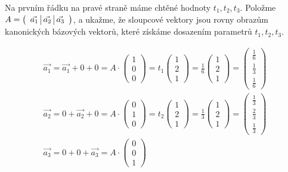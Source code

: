 \documentclass[12pt]{article}
\begin{document}
\begin{enumerate}
    Na prvním řádku na pravé straně máme chtěné hodnoty $t_1, t_2, t_3$.
    Položme $A = \left(\begin{array}{c} \vec{a_1} \;\vline\; \vec{a_2} \;\vline\; \vec{a_3} \end{array}\right)$,
    a ukažme, že sloupcové vektory jsou rovny obrazům kanonických bázových vektorů, které získáme dosazením parametrů $t_1, t_2, t_3$.

    \renewcommand{\arraystretch}{1.3}
    \begin{align*}
      \vec{a_1} = \vec{a_1} + 0 + 0 = A \cdot \left(\begin{array}{c} 1 \\ 0 \\ 0 \end{array}\right)
        = t_1 \left(\begin{array}{c} 1 \\ 2 \\ 1 \end{array}\right)
        = \frac{1}{6} \left(\begin{array}{c} 1 \\ 2 \\ 1 \end{array}\right)
        = \left(\begin{array}{c} \frac{1}{6} \\ \frac{1}{3} \\ \frac{1}{6} \end{array}\right) \\
      \vec{a_2} = 0 + \vec{a_2} + 0 = A \cdot \left(\begin{array}{c} 0 \\ 1 \\ 0 \end{array}\right)
        = t_2 \left(\begin{array}{c} 1 \\ 2 \\ 1 \end{array}\right)
        = \frac{1}{3} \left(\begin{array}{c} 1 \\ 2 \\ 1 \end{array}\right)
        = \left(\begin{array}{c} \frac{1}{3} \\ \frac{2}{3} \\ \frac{1}{3} \end{array}\right) \\
      \vec{a_3} = 0 + 0 + \vec{a_3} = A \cdot \left(\begin{array}{c} 0 \\ 0 \\ 1 \end{array}\right)

\end{align*}
\end{enumerate}
\end{document}
